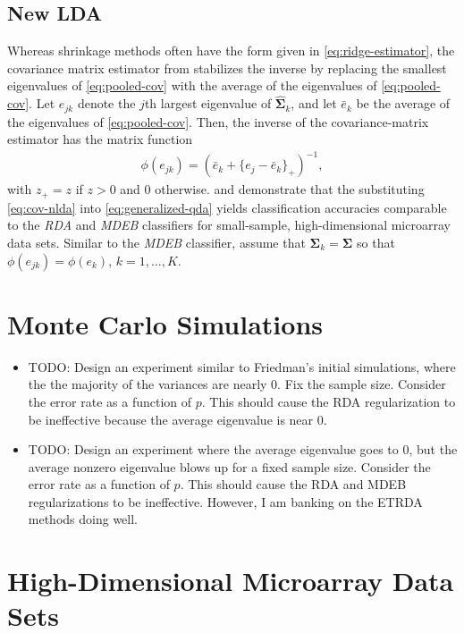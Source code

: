 \documentclass[11pt]{article}
\begin{document}
\subsection{New LDA}
Whereas shrinkage methods often have the form given in \eqref{eq:ridge-estimator}, the covariance matrix estimator from \cite{Thomaz:2006ef} stabilizes the inverse by replacing the smallest eigenvalues of \eqref{eq:pooled-cov} with the average of the eigenvalues of \eqref{eq:pooled-cov}. Let $e_{jk}$ denote the $j$th largest eigenvalue of $\widehat{\bm \Sigma}_k$, and let $\bar{e}_k$ be the average of the eigenvalues of \eqref{eq:pooled-cov}. Then, the inverse of the covariance-matrix estimator has the matrix function
\begin{align}
	\phi(e_{jk}) = (\bar{e}_k + \{e_j - \bar{e}_k\}_+)^{-1},\label{eq:cov-nlda}
\end{align}
with $z_+ = z$ if $z > 0$ and 0 otherwise. \cite*{Xu:2009fl} and \cite{Ramey:2011ji} demonstrate that the substituting \eqref{eq:cov-nlda} into \eqref{eq:generalized-qda} yields classification accuracies comparable to the \emph{RDA} and \emph{MDEB} classifiers for small-sample, high-dimensional microarray data sets. Similar to the \emph{MDEB} classifier, \cite{Thomaz:2006ef} assume that $\bm \Sigma_k = \bm \Sigma$ so that $\phi(e_{jk}) = \phi(e_k)$, $k = 1, \ldots, K$.  


\section{Monte Carlo Simulations}

\begin{itemize}
	\item TODO: Design an experiment similar to Friedman's initial simulations, where the the majority of the variances are nearly 0. Fix the sample size. Consider the error rate as a function of $p$. This should cause the RDA regularization to be ineffective because the average eigenvalue is near 0.
	
	\item TODO: Design an experiment where the average eigenvalue goes to 0, but the average nonzero eigenvalue blows up for a fixed sample size. Consider the error rate as a function of $p$. This should cause the RDA and MDEB regularizations to be ineffective. However, I am banking on the ETRDA methods doing well.

\end{itemize}

\section{High-Dimensional Microarray Data Sets}
\end{document}
